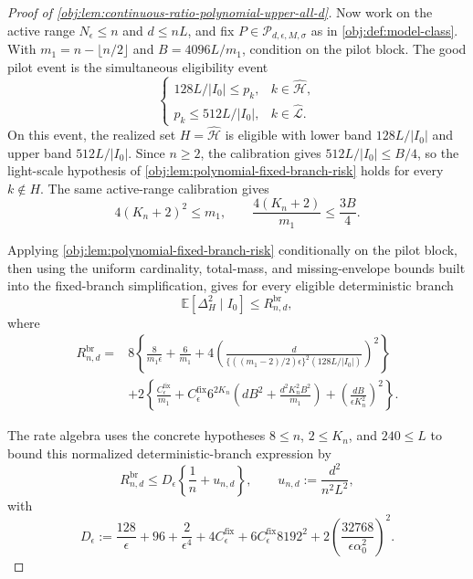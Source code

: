 \begin{proof}[Proof of \cref{obj:lem:continuous-ratio-polynomial-upper-all-d}]
Now work on the active range \(N_\epsilon\le n\) and \(d\le nL\), and fix \(P\in\mathcal P_{d,\epsilon,M,\sigma}\) as in \cref{obj:def:model-class}.  With \(m_1=n-\lfloor n/2\rfloor\) and \(B=4096L/m_1\), condition on the pilot block.  The good pilot event is the simultaneous eligibility event
\[
\left\{
\begin{array}{ll}
128L/|I_0|\le p_k, & k\in\widehat{\mathcal H},\\
p_k\le 512L/|I_0|, & k\in\widehat{\mathcal L}.
\end{array}
\right.
\]
On this event, the realized set \(H=\widehat{\mathcal H}\) is eligible with lower band \(128L/|I_0|\) and upper band \(512L/|I_0|\).  Since \(n\ge2\), the calibration gives \(512L/|I_0|\le B/4\), so the light-scale hypothesis of \cref{obj:lem:polynomial-fixed-branch-risk} holds for every \(k\notin H\).  The same active-range calibration gives
\[
4(K_n+2)^2\le m_1,
\qquad
\frac{4(K_n+2)}{m_1}\le \frac{3B}{4}.
\]

Applying \cref{obj:lem:polynomial-fixed-branch-risk} conditionally on the pilot block, then using the uniform cardinality, total-mass, and missing-envelope bounds built into the fixed-branch simplification, gives for every eligible deterministic branch
\[
\mathbb E\!\left[\Delta_H^2\mid I_0\right]
\le R_{n,d}^{\mathrm{br}},
\]
where
\[
\begin{aligned}
R_{n,d}^{\mathrm{br}}
={}&8\left\{
\frac{8}{m_1\epsilon}+\frac{6}{m_1}
+4\left(
\frac{d}{\{((m_1-2)/2)\epsilon\}^2(128L/|I_0|)}
\right)^2
\right\}\\
&+2\left\{
\frac{C_{\epsilon}^{\mathrm{fix}}}{m_1}
+C_{\epsilon}^{\mathrm{fix}}6^{2K_n}
\left(dB^2+\frac{d^2K_n^2B^2}{m_1}\right)
+\left(\frac{dB}{\epsilon K_n^2}\right)^2
\right\}.
\end{aligned}
\]

The rate algebra uses the concrete hypotheses \(8\le n\), \(2\le K_n\), and \(240\le L\) to bound this normalized deterministic-branch expression by
\[
R_{n,d}^{\mathrm{br}}
\le
D_\epsilon\left\{\frac1n+u_{n,d}\right\},
\qquad
u_{n,d}:=\frac{d^2}{n^2L^2},
\]
with
\[
D_\epsilon
:=
\frac{128}{\epsilon}+96+\frac{2}{\epsilon^4}
+4C_{\epsilon}^{\mathrm{fix}}
+6C_{\epsilon}^{\mathrm{fix}}8192^2
+2\left(\frac{32768}{\epsilon\alpha_0^2}\right)^2.
\]


\end{proof}
